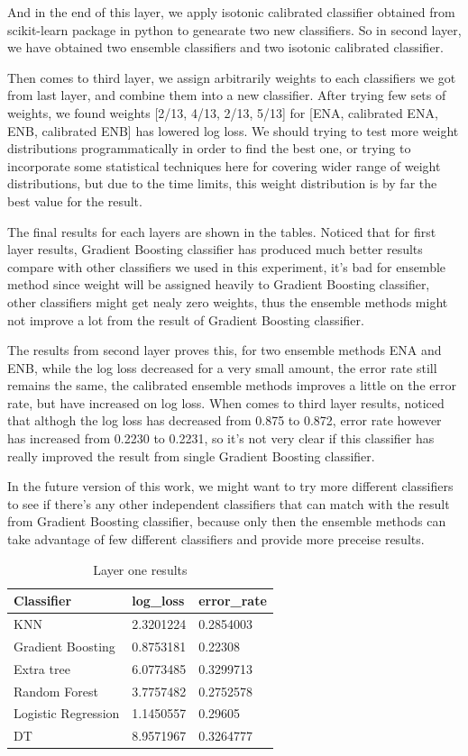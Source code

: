\documentclass{sig-alternate-05-2015}
\begin{document}
And in the end of this layer, we apply isotonic calibrated classifier obtained from scikit-learn package in python to genearate two new classifiers. So in second layer, we have obtained two ensemble classifiers and two isotonic calibrated classifier.

Then comes to third layer, we assign arbitrarily weights to each classifiers we got from last layer, and combine them into a new classifier. After trying few sets of weights, we found weights [2/13, 4/13, 2/13, 5/13] for [ENA, calibrated ENA, ENB, calibrated ENB] has lowered log loss. We should trying to test more weight distributions programmatically in order to find the best one, or trying to incorporate some statistical techniques here for covering wider range of weight distributions, but due to the time limits, this weight distribution is by far the best value for the result.

The final results for each layers are shown in the tables. Noticed that for first layer results, Gradient Boosting classifier has produced much better results compare with other classifiers we used in this experiment, it's bad for ensemble method since weight will be assigned heavily to Gradient Boosting classifier, other classifiers might get nealy zero weights,  thus the ensemble methods might not improve a lot from the result of Gradient Boosting classifier. 

The results from second layer proves this, for two ensemble methods ENA and ENB, while the log loss decreased for a very small amount, the error rate still remains the same, the calibrated ensemble methods improves a little on the error rate, but have increased on log loss. When comes to third layer results, noticed that althogh the log loss has decreased from 0.875 to 0.872, error rate however has increased from 0.2230 to 0.2231, so it's not very clear if this classifier has really improved the result from single Gradient Boosting classifier.

In the future version of this work, we might want to try more different classifiers to see if there's any other independent classifiers that can match with the result from Gradient Boosting classifier, because only then the ensemble methods can take advantage of few different classifiers and provide more preceise results.

\begin{table}[ht]
\centering
\caption{Layer one results}
\label{layer1}
\begin{tabular}{|l|l|l|}
\hline
Classifier          & log\_loss & error\_rate \\ \hline
KNN                 & 2.3201224 & 0.2854003   \\ \hline
Gradient Boosting   & 0.8753181 & 0.22308     \\ \hline
Extra tree          & 6.0773485 & 0.3299713   \\ \hline
Random Forest       & 3.7757482 & 0.2752578   \\ \hline
Logistic Regression & 1.1450557 & 0.29605     \\ \hline
DT                  & 8.9571967 & 0.3264777   \\ \hline
\end{tabular}
\end{table}
\end{document}
